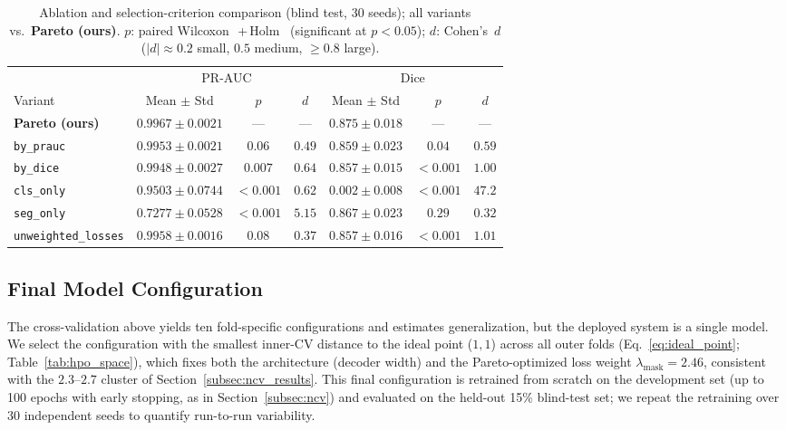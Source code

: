 \documentclass[final,5p,times,twocolumn,number]{elsarticle}
\newcommand{\rev}[1]{#1}
\begin{document}
\begin{table}[!t]
  \centering
  \caption{\rev{Ablation and selection-criterion comparison (blind test,
           30 seeds); all variants vs.\ \textbf{Pareto (ours)}. $p$: paired
           Wilcoxon~\citep{wilcoxon1945}\,+\,Holm~\citep{holm1979} (significant
           at $p<0.05$); $d$: Cohen's~$d$~\citep{cohen1988statistical}
           ($|d|\!\approx\!0.2$ small, $0.5$ medium, $\geq\!0.8$ large).}}
  \label{tab:ablation}
  \begin{tabular}{lcccccc}
    \toprule
    & \multicolumn{3}{c}{PR-AUC} & \multicolumn{3}{c}{Dice} \\
    \cmidrule(r){2-4}\cmidrule(l){5-7}
    Variant & Mean $\pm$ Std & $p$ & $d$ & Mean $\pm$ Std & $p$ & $d$ \\
    \midrule
    \textbf{Pareto (ours)} & $\mathbf{0.9967 \pm 0.0021}$ & — & — & $\mathbf{0.875 \pm 0.018}$ & — & — \\
    \rev{\texttt{by\_prauc}} & \rev{$0.9953 \pm 0.0021$} & \rev{$0.06$} & \rev{$0.49$} & \rev{$0.859 \pm 0.023$} & \rev{$0.04$} & \rev{$0.59$} \\
    \rev{\texttt{by\_dice}}  & \rev{$0.9948 \pm 0.0027$} & \rev{$0.007$} & \rev{$0.64$} & \rev{$0.857 \pm 0.015$} & \rev{$<0.001$} & \rev{$1.00$} \\
    \midrule
    \texttt{cls\_only}          & $0.9503 \pm 0.0744$ & $<0.001$ & $0.62$ & $0.002 \pm 0.008$ & $<0.001$ & $47.2$ \\
    \texttt{seg\_only}          & $0.7277 \pm 0.0528$ & $<0.001$ & $5.15$ & $0.867 \pm 0.023$ & $0.29$ & $0.32$ \\
    \texttt{unweighted\_losses} & $0.9958 \pm 0.0016$ & $0.08$ & $0.37$ & $0.857 \pm 0.016$ & $<0.001$ & $1.01$ \\
    \bottomrule
  \end{tabular}
\end{table}

\subsection{Final Model Configuration}
\label{subsec:final_config}

\rev{The cross-validation above yields ten fold-specific configurations and
estimates generalization, but the deployed system is a single model. We select
the configuration with the smallest inner-CV distance to the ideal point
($1,1$) across all outer folds (Eq.~\ref{eq:ideal_point};
Table~\ref{tab:hpo_space}), which fixes both
the architecture (decoder width) and the Pareto-optimized loss weight
$\lambda_{\text{mask}}=2.46$, consistent with the $2.3$--$2.7$ cluster of
Section~\ref{subsec:ncv_results}. This final configuration is retrained from
scratch on the development set (up to 100 epochs with early stopping, as in
Section~\ref{subsec:ncv}) and evaluated on the held-out 15\% blind-test
set; we repeat the retraining over 30 independent seeds to quantify
run-to-run variability.}
\end{document}

